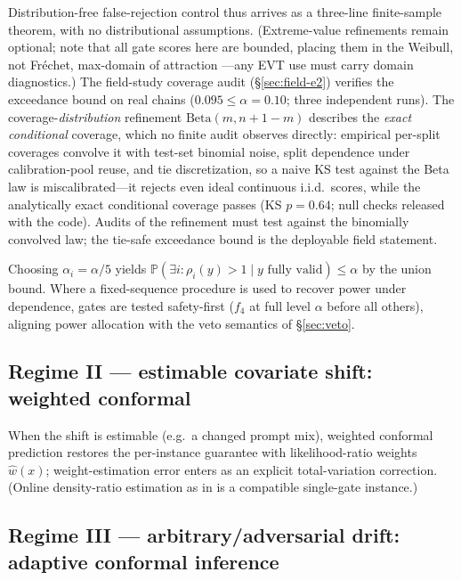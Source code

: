 Distribution-free false-rejection control thus arrives as a three-line
finite-sample theorem, with no distributional assumptions.
(Extreme-value refinements remain optional; note that all gate scores here are
bounded, placing them in the Weibull, not Fr\'echet, max-domain of attraction
\cite{coles2001}---any EVT use must carry domain diagnostics.) The
field-study coverage audit (\S\ref{sec:field-e2}) verifies the exceedance
bound on real chains ($0.095\le\alpha=0.10$; three independent runs). The
coverage-\emph{distribution} refinement $\mathrm{Beta}(m,n+1-m)$ describes
the \emph{exact conditional} coverage, which no finite audit observes
directly: empirical per-split coverages convolve it with test-set binomial
noise, split dependence under calibration-pool reuse, and tie discretization,
so a naive KS test against the Beta law is miscalibrated---it rejects even
ideal continuous i.i.d.\ scores, while the analytically exact conditional
coverage passes (KS $p=0.64$; null checks released with the code). Audits of
the refinement must test against the binomially convolved law; the tie-safe
exceedance bound is the deployable field statement.

\begin{theorem}
\label{thm:familywise}
Choosing $\alpha_i=\alpha/5$ yields
$\mathbb P(\exists i:\rho_i(y)>1\mid y\text{ fully valid})\le\alpha$ by the
union bound. Where a fixed-sequence procedure is used to recover power under
dependence, gates are tested safety-first ($f_4$ at full level $\alpha$ before
all others), aligning power allocation with the veto semantics of
\S\ref{sec:veto}.
\end{theorem}

\subsection{Regime II --- estimable covariate shift: weighted conformal}

When the shift is estimable (e.g.\ a changed prompt mix), weighted conformal
prediction \cite{tibshirani2019} restores the per-instance guarantee with
likelihood-ratio weights $\hat w(x)$; weight-estimation error enters as an
explicit total-variation correction. (Online density-ratio estimation as in
\cite{cofact2026} is a compatible single-gate instance.)

\subsection{Regime III --- arbitrary/adversarial drift: adaptive conformal
inference}
\label{sec:regime3}

